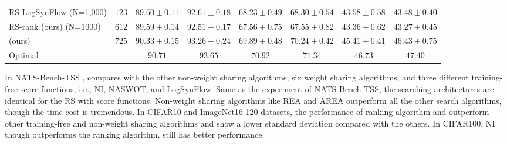 \documentclass[sigconf]{acmart}
\begin{document}
\begin{table*}[htb]
\begin{tabular}{@{}lccccccc@{}}
        RS-LogSynFlow (N=1,000) & $123$& $89.60 \pm 0.11$ & $92.61 \pm 0.18$ & $68.23 \pm 0.49$ & $68.30 \pm 0.54$  & $43.58 \pm 0.58$ & $43.48 \pm 0.40$ \\ 
        RS-rank (ours) (N=1000) & $612$& $89.59 \pm 0.14$ & $92.51 \pm 0.17$ & $67.56 \pm 0.75$ & $67.55 \pm 0.82$  & $43.36 \pm 0.62$ & $43.27 \pm 0.45$ \\ 
        \palg{} (ours)          & $725$& $90.33 \pm 0.15$ & $93.26 \pm 0.24$ & $69.89 \pm 0.48$ & $70.24 \pm 0.42$  & $45.41 \pm 0.41$ & $46.43 \pm 0.75$ \\ \midrule
        Optimal             &          & $90.71$          & $93.65$          & $70.92$          & $71.34$           & $46.73$          & $47.40$          \\ \bottomrule
        \end{tabular}
        \label{table:overall_sss}
          \vspace{-\baselineskip}
    \end{table*}

    In NATS-Bench-TSS \cite{Dong_2021},  compares \palg{} with the other non-weight sharing algorithms, six 
    weight sharing algorithms, and three different training-free score functions, i.e., NI, NASWOT, and 
    LogSynFlow. Same as the experiment of NATS-Bench-TSS, the searching architectures are identical 
    for the RS with score functions. Non-weight sharing algorithms like REA and AREA outperform all 
    the other search algorithms, though the time cost is tremendous. In CIFAR10 and ImageNet16-120 datasets, 
    the performance of ranking algorithm and \palg{} outperform other training-free and non-weight sharing 
    algorithms and show a lower standard deviation compared with the others. In CIFAR100, 
    NI though outperforms the ranking algorithm, \palg{} still has better performance. 
    
\end{document}
